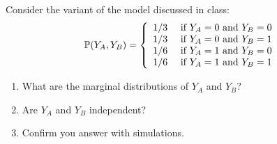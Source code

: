 \begin{exercise}
Consider the variant of the model discussed in class:
\begin{equation*}\label{eq:gene}
\mathbb P(Y_A,Y_B) = \left\{ \begin{array}{cc}
1/3 & \text{ if }Y_A=0 \text{ and } Y_B = 0\\
1/3 & \text{ if }Y_A=0 \text{ and } Y_B = 1\\
1/6 & \text{ if }Y_A=1 \text{ and } Y_B = 0\\
1/6 & \text{ if }Y_A=1 \text{ and } Y_B = 1\\
\end{array}
 \right.
\end{equation*}
\begin{enumerate}[label=(\alph*)]
\item What are the marginal distributions of $Y_A$ and $Y_B$?
\item Are $Y_A$ and $Y_B$ independent? 
\item Confirm you answer with simulations. 
\end{enumerate}
%

\end{exercise}


